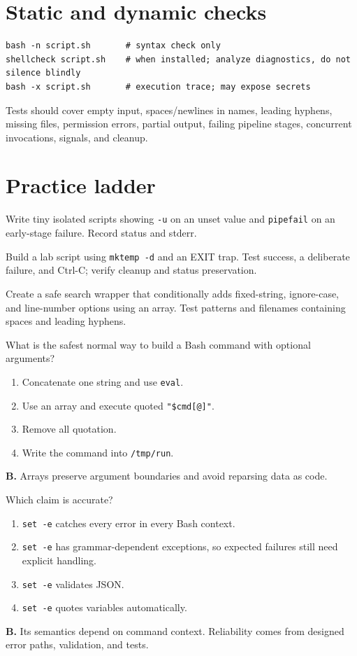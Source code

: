 \documentclass[11pt,oneside,openany]{book}
\newcommand{\fourchoices}[4]{%
  \begin{enumerate}[label=\Alph*),leftmargin=2em,itemsep=0.25em]
    \item #1
    \item #2
    \item #3
    \item #4
  \end{enumerate}}
\begin{document}
\section{Static and dynamic checks}
\begin{lstlisting}
bash -n script.sh       # syntax check only
shellcheck script.sh    # when installed; analyze diagnostics, do not silence blindly
bash -x script.sh       # execution trace; may expose secrets
\end{lstlisting}
Tests should cover empty input, spaces/newlines in names, leading hyphens, missing files, permission errors, partial output, failing pipeline stages, concurrent invocations, signals, and cleanup.

\section{Practice ladder}
\begin{practicebox}[title={Easy -- strict-mode observation}]
Write tiny isolated scripts showing \texttt{-u} on an unset value and \texttt{pipefail} on an early-stage failure. Record status and stderr.
\end{practicebox}
\begin{practicebox}[title={Medium -- temporary cleanup}]
Build a lab script using \texttt{mktemp -d} and an EXIT trap. Test success, a deliberate failure, and Ctrl-C; verify cleanup and status preservation.
\end{practicebox}
\begin{practicebox}[title={Hard -- array command builder}]
Create a safe search wrapper that conditionally adds fixed-string, ignore-case, and line-number options using an array. Test patterns and filenames containing spaces and leading hyphens.
\end{practicebox}

\begin{questionbox}[title={Medium 19.1 -- Command construction}]
What is the safest normal way to build a Bash command with optional arguments?
\fourchoices{Concatenate one string and use \texttt{eval}.}{Use an array and execute quoted \texttt{"\${cmd[@]}"}.}{Remove all quotation.}{Write the command into \texttt{/tmp/run}.}
\end{questionbox}
\begin{answerbox}
\textbf{B.} Arrays preserve argument boundaries and avoid reparsing data as code.
\end{answerbox}

\begin{questionbox}[title={Hard 19.2 -- \texttt{set -e}}]
Which claim is accurate?
\fourchoices{\texttt{set -e} catches every error in every Bash context.}{\texttt{set -e} has grammar-dependent exceptions, so expected failures still need explicit handling.}{\texttt{set -e} validates JSON.}{\texttt{set -e} quotes variables automatically.}
\end{questionbox}
\begin{answerbox}
\textbf{B.} Its semantics depend on command context. Reliability comes from designed error paths, validation, and tests.
\end{answerbox}
\end{document}

